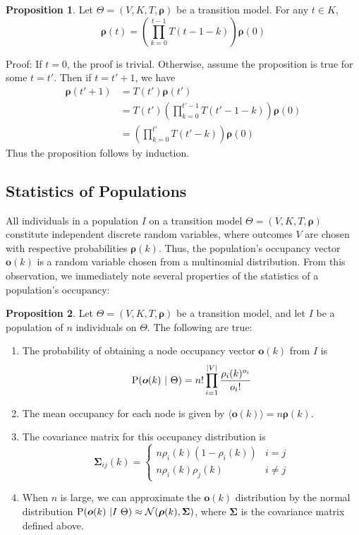 \documentclass[11pt,letterpaper]{article}
\theoremstyle{definition}
\newtheorem{proposition}{Proposition}[section]
\begin{document}
	\begin{proposition}
		Let $\Theta = (V, K, T, \bm \rho)$ be a transition model. For any $t \in K$,
		\[
		\bm \rho(t) = \left( \prod^{t - 1}_{k = 0} T(t - 1 - k) \right) \bm \rho(0)
		\]
	\end{proposition}
	Proof: If $t = 0$, the proof is trivial. Otherwise, assume the proposition is true for some $t = t'$. Then if $t = t' + 1$, we have
	\begin{align*}
		\bm \rho(t' + 1) &= T(t')\bm \rho(t') \\
		&= T(t') \left( \prod^{t' - 1}_{k = 0} T(t' - 1 - k) \right) \bm \rho(0) \\
		&= \left( \prod^{t'}_{k = 0} T(t' - k) \right) \bm \rho(0)
	\end{align*}
	Thus the proposition follows by induction.

	
	\subsection{Statistics of Populations}
	
	All individuals in a population $I$ on a transition model $\Theta = (V, K, T, \bm \rho)$ constitute independent discrete random variables, where outcomes $V$ are chosen with respective probabilities $\bm \rho(k)$. Thus, the population's occupancy vector $\bm o(k)$ is a random variable chosen from a multinomial distribution. From this observation, we immediately note several properties of the statistics of a population's occupancy:
	
	\begin{proposition}
		Let $\Theta = (V, K, T, \bm \rho)$ be a transition model, and let $I$ be a population of $n$ individuals on $\Theta$. The following are true:
		
		\begin{enumerate}
			\item 
			The probability of obtaining a node occupancy vector $\bm o(k)$ from $I$ is
					\[
					\text P(\bm o(k) ~|~ \Theta) = n! \prod^{|V|}_{i = 1} \frac{\rho_i(k)^{o_i}}{o_i!}
					\]
			\item
			The mean occupancy for each node is given by $\langle \bm o(k) \rangle = n\bm \rho(k)$.
			
			\item
			The covariance matrix for this occupancy distribution is
			\[
				\bm \Sigma_{ij}(k) = \left\{ \begin{array}{ll}
				n\rho_i(k)(1 - \rho_i(k)) & i = j \\
				n\rho_i(k) \rho_j(k) & i \ne j
				\end{array} \right.
			\]
			
			\item
			When $n$ is large, we can approximate the $\bm o(k)$ distribution by the normal distribution $\text P(\bm o(k) ~|I~\Theta) \approx \mathcal N(\bm \rho(k), \bm \Sigma)$, where $\bm \Sigma$ is the covariance matrix defined above.
			
		\end{enumerate}
			
		\end{proposition}
		
\end{document}
